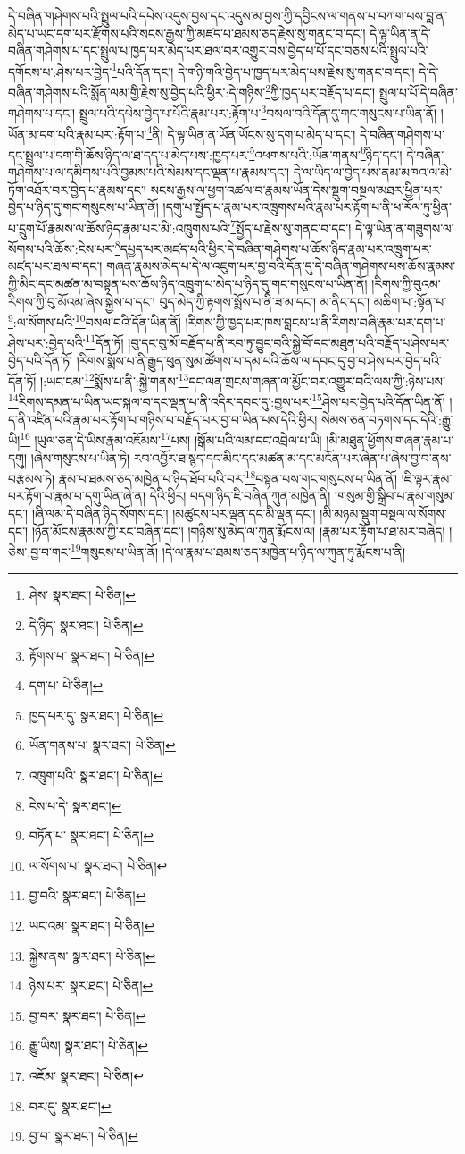 དེ་བཞིན་གཤེགས་པའི་སྤྲུལ་པའི་དཔེས་འདུས་བྱས་དང་འདུས་མ་བྱས་ཀྱི་དབྱིངས་ལ་གནས་པ་བཀག་པས་བླ་ན་མེད་པ་ཡང་དག་པར་རྫོགས་པའི་སངས་རྒྱས་ཀྱི་མཛད་པ་ཐམས་ཅད་རྗེས་སུ་གནང་བ་དང་། དེ་ལྟ་ཡིན་ན་དེ་བཞིན་གཤེགས་པ་དང་སྤྲུལ་པ་ཁྱད་པར་མེད་པར་ཐལ་བར་འགྱུར་བས་བྱེད་པ་པོ་དང་བཅས་པའི་སྤྲུལ་པའི་དགོངས་པ་:ཤེས་པར་བྱེད་\footnote{ཤེས་  སྣར་ཐང་།  པེ་ཅིན། }པའི་དོན་དང་། དེ་གཉི་གའི་བྱེད་པ་ཁྱད་པར་མེད་པས་རྗེས་སུ་གནང་བ་དང་། དེ་དེ་བཞིན་གཤེགས་པའི་སྨོན་ལམ་གྱི་རྗེས་སུ་བྱེད་པའི་ཕྱིར་:དེ་གཉིས་\footnote{དེ་ཉིད་  སྣར་ཐང་།  པེ་ཅིན། }ཀྱི་ཁྱད་པར་བརྗོད་པ་དང་། སྤྲུལ་པ་པོ་དེ་བཞིན་གཤེགས་པ་དང་། སྤྲུལ་པའི་དཔེས་བྱེད་པ་པོའི་རྣམ་པར་:རྟོག་པ་\footnote{རྟོགས་པ་  སྣར་ཐང་།  པེ་ཅིན། }བསལ་བའི་དོན་དུ་གང་གསུངས་པ་ཡིན་ནོ། །ཡོན་མ་དག་པའི་རྣམ་པར་:རྟོག་པ་\footnote{དག་པ་  པེ་ཅིན། }ནི། དེ་ལྟ་ཡིན་ན་ཡོན་ཡོངས་སུ་དག་པ་མེད་པ་དང་། དེ་བཞིན་གཤེགས་པ་དང་སྤྲུལ་པ་དག་གི་ཆོས་ཉིད་ལ་ཐ་དད་པ་མེད་པས་:ཁྱད་པར་\footnote{ཁྱད་པར་དུ་  སྣར་ཐང་།  པེ་ཅིན། }འཕགས་པའི་:ཡོན་གནས་\footnote{ཡོན་གནས་པ་  སྣར་ཐང་།  པེ་ཅིན། }ཉིད་དང་། དེ་བཞིན་གཤེགས་པ་ལ་དམིགས་པའི་བྱམས་པའི་སེམས་དང་ལྡན་པ་རྣམས་དང་། དེ་ལ་ཡིད་ལ་བྱེད་པས་ནམ་མཁའ་ལ་མེ་ཏོག་འཐོར་བར་བྱེད་པ་རྣམས་དང་། སངས་རྒྱས་ལ་ཕྱག་འཚལ་བ་རྣམས་ཡོན་དེས་སྡུག་བསྔལ་མཐར་ཕྱིན་པར་བྱེད་པ་ཉིད་དུ་གང་གསུངས་པ་ཡིན་ནོ། །དགུ་པ་སྤྱོད་པ་རྣམ་པར་འཁྲུགས་པའི་རྣམ་པར་རྟོག་པ་ནི་ཕ་རོལ་ཏུ་ཕྱིན་པ་དྲུག་པོ་རྣམས་ལ་ཆོས་ཉིད་རྣམ་པར་མི་:འཁྲུགས་པའི་\footnote{འཁྲུག་པའི་  སྣར་ཐང་།  པེ་ཅིན། }སྤྱོད་པ་རྗེས་སུ་གནང་བ་དང་། དེ་ལྟ་ཡིན་ན་གཟུགས་ལ་སོགས་པའི་ཆོས་:ངེས་པར་\footnote{ངེས་པ་དེ་  སྣར་ཐང་། }དཔྱད་པར་མཛད་པའི་ཕྱིར་དེ་བཞིན་གཤེགས་པ་ཆོས་ཉིད་རྣམ་པར་འཁྲུག་པར་མཛད་པར་ཐལ་བ་དང་། གཞན་རྣམས་མེད་པ་དེ་ལ་འཇུག་པར་བྱ་བའི་དོན་དུ་དེ་བཞིན་གཤེགས་པས་ཆོས་རྣམས་ཀྱི་མིང་དང་མཚན་མ་བསྟན་པས་ཆོས་ཉིད་འཁྲུག་པ་མེད་པ་ཉིད་དུ་གང་གསུངས་པ་ཡིན་ནོ། །རིགས་ཀྱི་བུའམ་རིགས་ཀྱི་བུ་མོའམ་ཞེས་སྐྱེས་པ་དང་། བུད་མེད་ཀྱི་རྟགས་སྨོས་པ་ནི་ཟ་མ་དང་། མ་ནིང་དང་། མཆིག་པ་:སྟོན་པ་\footnote{བཏོན་པ་  སྣར་ཐང་།  པེ་ཅིན། }:ལ་སོགས་པའི་\footnote{ལ་སོགས་པ་  སྣར་ཐང་།  པེ་ཅིན། }བསལ་བའི་དོན་ཡིན་ནོ། །རིགས་ཀྱི་ཁྱད་པར་ཁས་བླངས་པ་ནི་རིགས་བཞི་རྣམ་པར་དག་པ་ཤེས་པར་:བྱེད་པའི་\footnote{བྱ་བའི་  སྣར་ཐང་།  པེ་ཅིན། }དོན་ཏོ། །བུ་དང་བུ་མོ་བརྗོད་པ་ནི་རབ་ཏུ་བྱུང་བའི་སྐྱེ་བོ་དང་མཐུན་པའི་བརྗོད་པ་ཤེས་པར་བྱེད་པའི་དོན་ཏོ། །རིགས་སྨོས་པ་ནི་རྒྱུད་ཕུན་སུམ་ཚོགས་པ་དམ་པའི་ཆོས་ལ་དབང་དུ་བྱ་བ་ཤེས་པར་བྱེད་པའི་དོན་ཏོ། །:ཡང་ངམ་\footnote{ཡང་འམ་  སྣར་ཐང་།  པེ་ཅིན། }སྨོས་པ་ནི་:སྐྱེ་གནས་\footnote{སྐྱེས་ནས་  སྣར་ཐང་།  པེ་ཅིན། }དང་ལན་གྲངས་གཞན་ལ་མྱོང་བར་འགྱུར་བའི་ལས་ཀྱི་:ཉེས་པས་\footnote{ཉེས་པར་  སྣར་ཐང་།  པེ་ཅིན། }རིགས་དམན་པ་ཡིན་ཡང་སྐལ་བ་དང་ལྡན་པ་ནི་འདིར་དབང་དུ་:བྱས་པར་\footnote{བྱ་བར་  སྣར་ཐང་།  པེ་ཅིན། }ཤེས་པར་བྱེད་པའི་དོན་ཡིན་ནོ། །ད་ནི་འཛིན་པའི་རྣམ་པར་རྟོག་པ་གཉིས་པ་བརྗོད་པར་བྱ་བ་ཡིན་པས་དེའི་ཕྱིར། སེམས་ཅན་བཏགས་དང་དེའི་:རྒྱུ་ཡི།\footnote{རྒྱུ་ཡིས།  སྣར་ཐང་།  པེ་ཅིན། } །ཡུལ་ཅན་དེ་ཡིས་རྣམ་འཇོམས་\footnote{འཇོམ་  སྣར་ཐང་།  པེ་ཅིན། }པས། །སྒོམ་པའི་ལམ་དང་འབྲེལ་པ་ཡི། །མི་མཐུན་ཕྱོགས་གཞན་རྣམ་པ་དགུ། །ཞེས་གསུངས་པ་ཡིན་ཏེ། རབ་འབྱོར་ཐ་སྙད་དང་མིང་དང་མཚན་མ་དང་མངོན་པར་ཞེན་པ་ཞེས་བྱ་བ་ནས་བརྩམས་ཏེ། རྣམ་པ་ཐམས་ཅད་མཁྱེན་པ་ཉིད་ཐོབ་པའི་བར་\footnote{བར་དུ་  སྣར་ཐང་། }བསྟན་པས་གང་གསུངས་པ་ཡིན་ནོ། །ཇི་ལྟར་རྣམ་པར་རྟོག་པ་རྣམ་པ་དགུ་ཡིན་ཞེ་ན། དེའི་ཕྱིར། བདག་ཉིད་ཇི་བཞིན་ཀུན་མཁྱེན་ནི། །གསུམ་གྱི་སྒྲིབ་པ་རྣམ་གསུམ་དང་། །ཞི་ལམ་དེ་བཞིན་ཉིད་སོགས་དང་། །མཚུངས་པར་ལྡན་དང་མི་ལྡན་དང་། །མི་མཉམ་སྡུག་བསྔལ་ལ་སོགས་དང་། །ཉོན་མོངས་རྣམས་ཀྱི་རང་བཞིན་དང་། །གཉིས་སུ་མེད་ལ་ཀུན་རྨོངས་ལ། །རྣམ་པར་རྟོག་པ་ཐ་མར་བཞེད། །ཅེས་:བྱ་བ་གང་\footnote{བྱ་བ་  སྣར་ཐང་།  པེ་ཅིན། }གསུངས་པ་ཡིན་ནོ། །དེ་ལ་རྣམ་པ་ཐམས་ཅད་མཁྱེན་པ་ཉིད་ལ་ཀུན་ཏུ་རྨོངས་པ་ནི། 